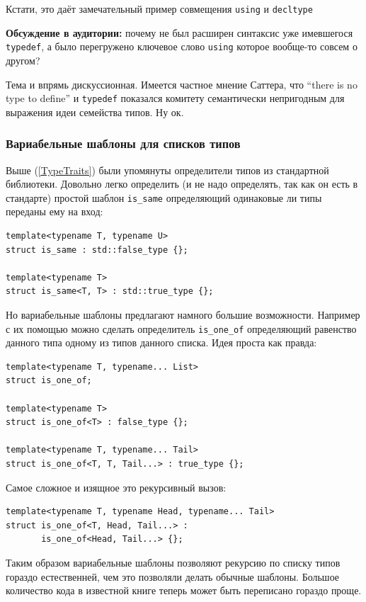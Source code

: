 \documentclass[a4paper,12pt,oneside]{article}
\begin{document}
Кстати, это даёт замечательный пример совмещения \lstinline!using! и \lstinline!decltype!

\textbf{Обсуждение в аудитории:} почему не был расширен синтаксис уже имевшегося \lstinline!typedef!, а было перегружено ключевое слово \lstinline!using! которое вообще-то совсем о другом?

Тема и впрямь дискуссионная. Имеется частное мнение Саттера, что ``there is no type to define'' и \lstinline!typedef! показался комитету семантически непригодным для выражения идеи семейства типов. Ну ок.

\subsubsection{Вариабельные шаблоны для списков типов}

Выше (\ref{TypeTraits}) были упомянуты определители типов из стандартной библиотеки. Довольно легко определить (и не надо определять, так как он есть в стандарте) простой шаблон \lstinline!is_same! определяющий одинаковые ли типы переданы ему на вход:

\begin{lstlisting}
template<typename T, typename U>
struct is_same : std::false_type {};
 
template<typename T>
struct is_same<T, T> : std::true_type {};
\end{lstlisting}

Но вариабельные шаблоны предлагают намного большие возможности. Например с их помощью можно сделать определитель \lstinline!is_one_of! определяющий равенство данного типа одному из типов данного списка. Идея проста как правда:

\begin{lstlisting}
template<typename T, typename... List>
struct is_one_of;

template<typename T>
struct is_one_of<T> : false_type {};

template<typename T, typename... Tail>
struct is_one_of<T, T, Tail...> : true_type {};
\end{lstlisting}

Самое сложное и изящное это рекурсивный вызов:

\begin{lstlisting}
template<typename T, typename Head, typename... Tail>
struct is_one_of<T, Head, Tail...> : 
       is_one_of<Head, Tail...> {};
\end{lstlisting}

Таким образом вариабельные шаблоны позволяют рекурсию по списку типов гораздо естественней, чем это позволяли делать обычные шаблоны. Большое количество кода в известной книге \cite{mcpp} теперь может быть переписано гораздо проще.
\end{document}
